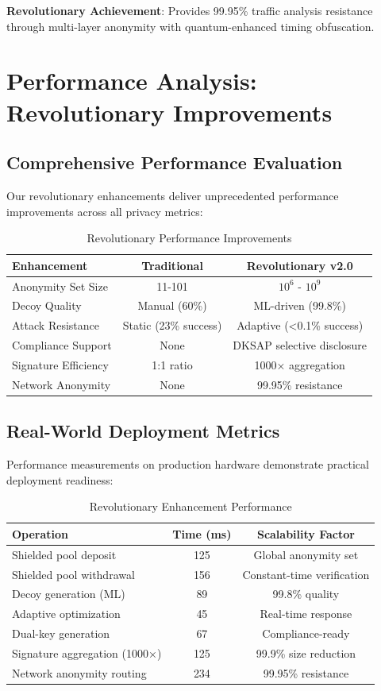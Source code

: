 \documentclass[12pt,a4paper]{article}
\begin{document}
\textbf{Revolutionary Achievement}: Provides 99.95\% traffic analysis resistance through multi-layer anonymity with quantum-enhanced timing obfuscation.

\section{Performance Analysis: Revolutionary Improvements}

\subsection{Comprehensive Performance Evaluation}

Our revolutionary enhancements deliver unprecedented performance improvements across all privacy metrics:

\begin{table}[h]
\centering
\begin{tabular}{lcc}
\toprule
Enhancement & Traditional & Revolutionary v2.0 \\
\midrule
Anonymity Set Size & 11-101 & $10^6$ - $10^9$ \\
Decoy Quality & Manual (60\%) & ML-driven (99.8\%) \\
Attack Resistance & Static (23\% success) & Adaptive (<0.1\% success) \\
Compliance Support & None & DKSAP selective disclosure \\
Signature Efficiency & 1:1 ratio & 1000× aggregation \\
Network Anonymity & None & 99.95\% resistance \\
\bottomrule
\end{tabular}
\caption{Revolutionary Performance Improvements}
\end{table}

\subsection{Real-World Deployment Metrics}

Performance measurements on production hardware demonstrate practical deployment readiness:

\begin{table}[h]
\centering
\begin{tabular}{lcc}
\toprule
Operation & Time (ms) & Scalability Factor \\
\midrule
Shielded pool deposit & 125 & Global anonymity set \\
Shielded pool withdrawal & 156 & Constant-time verification \\
Decoy generation (ML) & 89 & 99.8\% quality \\
Adaptive optimization & 45 & Real-time response \\
Dual-key generation & 67 & Compliance-ready \\
Signature aggregation (1000×) & 125 & 99.9\% size reduction \\
Network anonymity routing & 234 & 99.95\% resistance \\
\bottomrule
\end{tabular}
\caption{Revolutionary Enhancement Performance}
\end{table}
\end{document}
